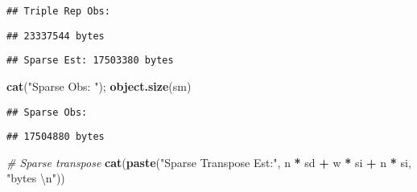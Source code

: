 \documentclass[]{article}
\newenvironment{Shaded}{\begin{snugshade}}{\end{snugshade}}
\newcommand{\CharTok}[1]{\textcolor[rgb]{0.31,0.60,0.02}{#1}}
\newcommand{\CommentTok}[1]{\textcolor[rgb]{0.56,0.35,0.01}{\textit{#1}}}
\newcommand{\DataTypeTok}[1]{\textcolor[rgb]{0.13,0.29,0.53}{#1}}
\newcommand{\KeywordTok}[1]{\textcolor[rgb]{0.13,0.29,0.53}{\textbf{#1}}}
\newcommand{\NormalTok}[1]{#1}
\newcommand{\OperatorTok}[1]{\textcolor[rgb]{0.81,0.36,0.00}{\textbf{#1}}}
\newcommand{\StringTok}[1]{\textcolor[rgb]{0.31,0.60,0.02}{#1}}
\begin{document}
\begin{verbatim}
## Triple Rep Obs:
\end{verbatim}

\begin{verbatim}
## 23337544 bytes
\end{verbatim}

\begin{Shaded}
\end{Shaded}

\begin{verbatim}
## Sparse Est: 17503380 bytes
\end{verbatim}

\begin{Shaded}
\begin{Highlighting}[]
\KeywordTok{cat}\NormalTok{(}\StringTok{"Sparse Obs: "}\NormalTok{); }\KeywordTok{object.size}\NormalTok{(sm)}
\end{Highlighting}
\end{Shaded}

\begin{verbatim}
## Sparse Obs:
\end{verbatim}

\begin{verbatim}
## 17504880 bytes
\end{verbatim}

\begin{Shaded}
\begin{Highlighting}[]
\CommentTok{# Sparse transpose}
\KeywordTok{cat}\NormalTok{(}\KeywordTok{paste}\NormalTok{(}\StringTok{"Sparse Transpose Est:"}\NormalTok{, n }\OperatorTok{*}\StringTok{ }\NormalTok{sd }\OperatorTok{+}\StringTok{ }\NormalTok{w }\OperatorTok{*}\StringTok{ }\NormalTok{si }\OperatorTok{+}\StringTok{ }\NormalTok{n }\OperatorTok{*}\StringTok{ }\NormalTok{si, }\StringTok{"bytes }\CharTok{\textbackslash{}n}\StringTok{"}\NormalTok{))}
\end{Highlighting}
\end{Shaded}
\end{document}
